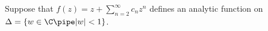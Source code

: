 Suppose that $f(z)=z+\sum_{n=2}^{\infty}c_nz^n$ defines an analytic
function on $\Delta=\{w\in \C \pipe |w|<1\}$. 
